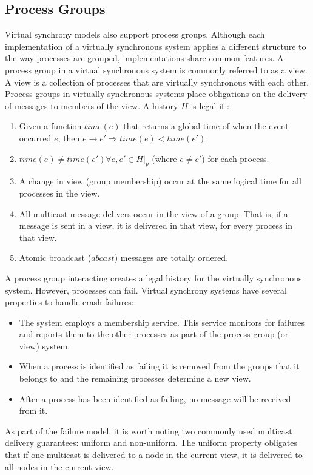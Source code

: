 \subsection{Process Groups}
Virtual synchrony models also support process groups. Although each implementation of a virtually synchronous system applies a different structure to the way processes are grouped, implementations share common features.
A process group in a virtual synchronous system is commonly referred to as a view. A view is a collection of processes that are virtually synchronous with each other. Process groups in virtually synchronous systems place obligations on the delivery of messages to members of the view. A history $H$ is legal if \cite[p~.103]{ISISTOOLKIT}:
\begin{enumerate}
    \item Given a function $time(e)$ that returns a global time of when the event occurred $e$, then $e \rightarrow e' \Rightarrow time(e) < time(e').$
    \item $time(e) \neq time(e') \forall e, e' \in H|_{p}$ (where $e \neq e'$) for each process.
    \item A change in view (group membership) occur at the same logical time for all processes in the view.
    \item All multicast message delivers occur in the view of a group. That is, if a message is sent in a view, it is delivered in that view, for every process in that view.
    \item Atomic broadcast ($abcast$) messages are totally ordered.
\end{enumerate} 
A process group interacting creates a legal history for the virtually synchronous system. However, processes can fail.  Virtual synchrony systems have several properties to handle crash failures\cite[p~.102]{ISISTOOLKIT}:
\begin{itemize}
    \item The system employs a membership service. This service monitors for failures and reports them to the other processes as part of the process group (or view) system.
    \item When a process is identified as failing it is removed from the groups that it belongs to and the remaining processes determine a new view.
    \item After a process has been identified as failing, no message will be received from it.
\end{itemize} 
As part of the failure model, it is worth noting two commonly used multicast delivery guarantees: uniform and non-uniform. The uniform property obligates that if one multicast is delivered to a node in the current view, it is delivered to all nodes in the current view.
